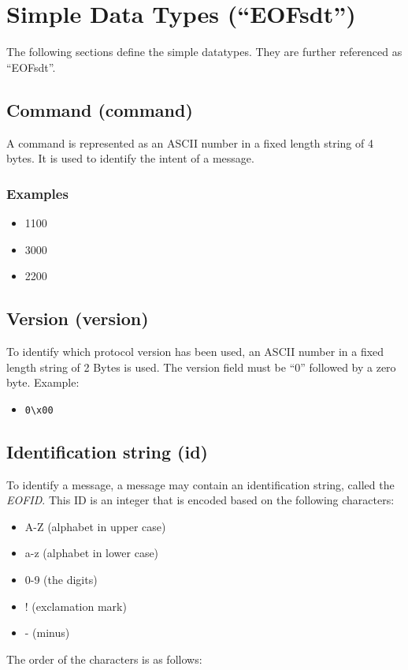 \section{Simple Data Types ("`EOFsdt"')}
The following sections define the simple datatypes.
They are further referenced as "`EOFsdt"'.
\subsection{Command (command)}
A command is represented as an ASCII number in a fixed length string of
4 bytes. It is used to identify the intent of a message.
\subsubsection{Examples}
\begin{itemize}
\item 1100
\item 3000
\item 2200
\end{itemize}
\subsection{Version (version)}
\label{versionfield}
To identify which protocol version has been used, an
ASCII number in a fixed length string of 2 Bytes is used.
The version field must be "`0"' followed by a zero byte.
Example:
\begin{itemize}
\item \verb=0\x00=
\end{itemize}
\subsection{Identification string (id)}
\label{eofid}
To identify a message, a message may contain an identification string,
called the \textit{EOFID}.
This ID is an integer that is encoded based on the following characters:
\begin{itemize}
\item A-Z (alphabet in upper case)
\item a-z (alphabet in lower case)
\item 0-9 (the digits)
\item ! (exclamation mark)
\item - (minus)
\end{itemize}
The order of the characters is as follows:

